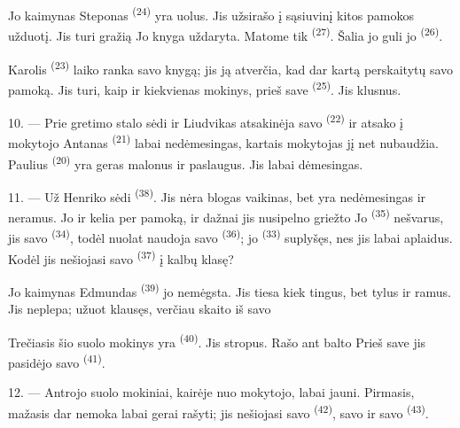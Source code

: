 Jo kaimynas Steponas \textsuperscript{(24)} yra uolus. Jis užsirašo į sąsiuvinį kitos
pamokos užduotį. Jis turi gražią  Jo knyga uždaryta. Matome tik
 \textsuperscript{(27)}. Šalia jo guli jo 
\textsuperscript{(26)}.

Karolis \textsuperscript{(23)} laiko ranka savo knygą; jis ją atverčia, kad dar kartą
perskaitytų savo pamoką. Jis turi, kaip ir kiekvienas mokinys, prieš save
 \textsuperscript{(25)}. Jis klusnus.

10. --- Prie gretimo stalo sėdi  ir 
Liudvikas atsakinėja savo  \textsuperscript{(22)} ir atsako į mokytojo
 Antanas \textsuperscript{(21)} labai nedėmesingas, kartais
mokytojas jį net nubaudžia. Paulius \textsuperscript{(20)} yra geras 
malonus ir paslaugus. Jis labai dėmesingas.

\VUsaut{4.2mm}
\VUsaut{3.2mm}

11. --- Už Henriko sėdi  \textsuperscript{(38)}. Jis nėra blogas
vaikinas, bet yra  nedėmesingas ir neramus. Jo
 ir  kelia  per
pamoką, ir dažnai jis nusipelno griežto  Jo  \textsuperscript{(35)} nešvarus, jis  savo
 \textsuperscript{(34)}, todėl nuolat naudoja savo 
\textsuperscript{(36)}; jo  \textsuperscript{(33)} suplyšęs, nes jis
labai aplaidus. Kodėl jis nešiojasi savo 
\textsuperscript{(37)} į  kalbų klasę?

Jo kaimynas Edmundas \textsuperscript{(39)} jo nemėgsta. Jis tiesa kiek tingus, bet
tylus ir ramus. Jis neplepa; užuot klausęs, verčiau skaito  iš savo

Trečiasis šio suolo mokinys yra  \textsuperscript{(40)}. Jis
stropus. Rašo ant balto  Prieš save jis pasidėjo savo
 \textsuperscript{(41)}.

12. --- Antrojo suolo mokiniai, kairėje nuo mokytojo, labai jauni. Pirmasis, mažasis
 dar nemoka labai gerai rašyti; jis nešiojasi savo  \textsuperscript{(42)}, savo  ir savo 
\textsuperscript{(43)}.

